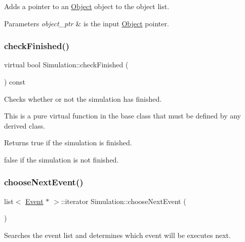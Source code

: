 Adds a pointer to an \hyperlink{class_object}{Object} object to the object list. 
\begin{DoxyParams}{Parameters}
{\em object\+\_\+ptr} & is the input \hyperlink{class_object}{Object} pointer. \\
\hline
\end{DoxyParams}
\mbox{\label{class_simulation_af69bb46977a3a0084214a194c888e16c}} 
\subsubsection{\texorpdfstring{check\+Finished()}{checkFinished()}}
{\footnotesize\ttfamily virtual bool Simulation\+::check\+Finished (\begin{DoxyParamCaption}{ }\end{DoxyParamCaption}) const\hspace{0.3cm}{\ttfamily [pure virtual]}}

Checks whether or not the simulation has finished.

This is a pure virtual function in the base class that must be defined by any derived class. \begin{DoxyReturn}{Returns}
true if the simulation is finished. 

false if the simulation is not finished. 
\end{DoxyReturn}
\mbox{\label{class_simulation_a401d40509ba367a28702873a0d65188d}} 
\subsubsection{\texorpdfstring{choose\+Next\+Event()}{chooseNextEvent()}}
{\footnotesize\ttfamily list$<$ \hyperlink{class_event}{Event} $\ast$ $>$\+::iterator Simulation\+::choose\+Next\+Event (\begin{DoxyParamCaption}{ }\end{DoxyParamCaption})\hspace{0.3cm}{\ttfamily [protected]}}



Searches the event list and determines which event will be executes next. 

